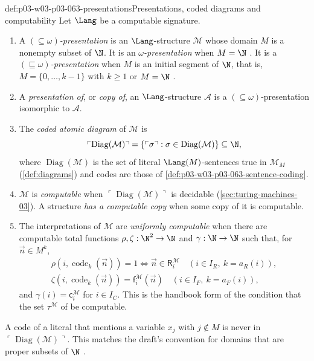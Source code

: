 \begin{hbdefinition}{def:p03-w03-p03-063-presentations}{Presentations, coded diagrams and computability}
Let \(\Lang\) be a computable signature.
\begin{enumerate}
\item A \emph{\((\subseteq\omega)\)-presentation} is an \(\Lang\)-structure
  \(\mathcal M\) whose domain \(M\) is a nonempty subset of \(\N\).  It is
  an \emph{\(\omega\)-presentation} when \(M=\N\)
  \cite[Definition~I.1, p.~1]{Montalban2019CSTDraft}.  It is a
  \emph{\((\sqsubseteq\omega)\)-presentation} when \(M\) is an initial
  segment of \(\N\), that is, \(M=\{0,\ldots,k-1\}\) with \(k\geq1\) or
  \(M=\N\) \cite[pp.~3--4]{Montalban2019CSTDraft}.
\item A \emph{presentation of}, or \emph{copy of}, an \(\Lang\)-structure
  \(\mathcal A\) is a \((\subseteq\omega)\)-presentation isomorphic to
  \(\mathcal A\).
\item The \emph{coded atomic diagram} of \(\mathcal M\) is
  \[
   \ulcorner\operatorname{Diag}(\mathcal M)\urcorner
   =\{\ulcorner\sigma\urcorner:\sigma\in\operatorname{Diag}(\mathcal M)\}
   \subseteq\N,
  \]
  where \(\operatorname{Diag}(\mathcal M)\) is the set of literal
  \(\Lang(M)\)-sentences true in \(\mathcal M_M\)
  (\cref{def:diagrams}) and codes are those of
  \cref{def:p03-w03-p03-063-sentence-coding}.
\item \(\mathcal M\) is \emph{computable} when
  \(\ulcorner\operatorname{Diag}(\mathcal M)\urcorner\) is decidable
  (\cref{sec:turing-machines-03}).  A structure \emph{has a computable
  copy} when some copy of it is computable.
\item The interpretations of \(\mathcal M\) are \emph{uniformly computable}
  when there are computable total functions
  \(\rho,\zeta:\N^2\to\N\) and \(\gamma:\N\to\N\) such that, for
  \(\vec n\in M^k\),
  \begin{gather*}
   \rho(i,\operatorname{code}_k(\vec n))=1\iff \vec n\in\mathsf R_i^{\mathcal M}
   \quad(i\in I_R,\ k=a_R(i)),\\
   \zeta(i,\operatorname{code}_k(\vec n))=\mathsf f_i^{\mathcal M}(\vec n)
   \quad(i\in I_F,\ k=a_F(i)),
  \end{gather*}
  and \(\gamma(i)=\mathsf c_i^{\mathcal M}\) for \(i\in I_C\).
  This is the handbook form of the condition that the set
  \(\tau^{\mathcal M}\) of \cite[Definition~I.1, p.~2]{Montalban2019CSTDraft}
  be computable.
\end{enumerate}
A code of a literal that mentions a variable \(x_j\) with \(j\notin M\) is
never in \(\ulcorner\operatorname{Diag}(\mathcal M)\urcorner\).  This
matches the draft's convention for domains that are proper subsets of \(\N\)
\cite[Section~I.1.3, p.~3]{Montalban2019CSTDraft}.
\end{hbdefinition}

